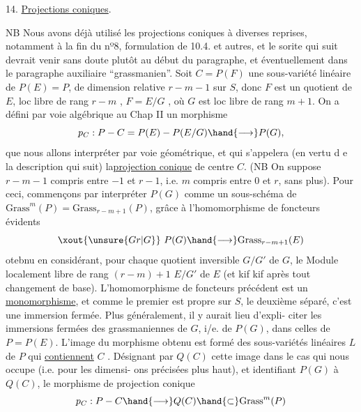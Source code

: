 
14. \uline{Projections coniques}.

NB Nous avons déjà utilisé les projections coniques à diverses
\margin{$\|$}reprises, notamment à la fin du nº8, formulation de 10.4. et autres, et
le sorite qui suit devrait venir sans doute plutôt au début du paragraphe,
et éventuellement dans le paragraphe auxiliaire ``grassmanien''.
Soit $C = P(F)$ une sous-variété linéaire de $P(E)=P$, de dimension
relative $r-m-1$  sur $S$, donc $F$ est un quotient de $E$, loc libre de
rang $r-m$ , $F=E/G$ , où $G$ est loc libre de rang $m+1$. On a défini
par voie algébrique au Chap II un morphisme
\[ p_C : P - C = P(E) - P(E/G) \hand{\longrightarrow} P(G) , \]
que nous allons interpréter par voie géométrique, et qui s'appelera
(en vertu d e la description qui suit) la\uline{projection conique} de centre $C$.
(NB On suppose $r-m-1$ compris entre $-1$ et $r-1$, i.e. $m$ compris entre $0$
et $r$, sans plus). Pour ceci, commençons par interpréter  $P(G)$
comme un sous-schéma de $\mathrm{Grass}^m(P)= \mathrm{Grass}_{r-m+1}(P)$, grâce à l'homomorphisme
de foncteurs évidents
\[ \xout{\unsure{Gr|G}}\ P(G) \hand{\longrightarrow} \mathrm{Grass}_{r-m+1}(E) \]
otebnu en considérant, pour chaque quotient inversible $G/G'$ de $G$, le
Module localement libre de rang $(r-m)+1$ $E/G'$ de $E$ (et kif kif après
tout changement de base). L'homomorphisme de foncteurs précédent est un
\uline{monomorphisme}, et comme le premier est propre sur $S$, le deuxième séparé,
c'est une immersion fermée. \xout{\unsure{(}}Plus généralement, il y aurait lieu d'expli-%
citer les immersions fermées des grassmaniennes de $G$, i/e. de $P(G)$,
dans celles de  $P=P(E)$.  L'image du morphisme obtenu est formé des
sous-variétés linéaires  $L$ de $P$ qui \uline{contiennent} $C$ . Désignant
par $Q(C)$ cette image dans le cas qui nous occupe (i.e. pour les dimensi-%
ons précisées plus haut), et identifiant $P(G)$ à $Q(C)$, le morphisme
de projection conique
\[ p_C : P - C \hand{\longrightarrow} Q(C) \hand{\subset} \mathrm{Grass}^m(P) \]

